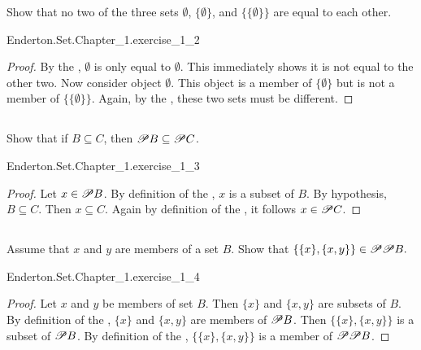 \documentclass{report}
\begin{document}
  Show that no two of the three sets $\emptyset$, $\{\emptyset\}$, and
    $\{\{\emptyset\}\}$ are equal to each other.

    {Enderton.Set.Chapter\_1.exercise\_1\_2}

  \begin{proof}
    By the , $\emptyset$ is only equal to
      $\emptyset$.
    This immediately shows it is not equal to the other two.
    Now consider object $\emptyset$.
    This object is a member of $\{\emptyset\}$ but is not a member of
      $\{\{\emptyset\}\}$.
    Again, by the , these two sets must be
      different.
  \end{proof}

\subsection{}%

  Show that if $B \subseteq C$, then $\mathscr{P}B \subseteq \mathscr{P}C$.

    {Enderton.Set.Chapter\_1.exercise\_1\_3}

  \begin{proof}
    Let $x \in \mathscr{P}B$.
    By definition of the , $x$ is a subset of $B$.
    By hypothesis, $B \subseteq C$.
    Then $x \subseteq C$.
    Again by definition of the , it follows
      $x \in \mathscr{P}C$.
  \end{proof}

\subsection{}%

  Assume that $x$ and $y$ are members of a set $B$.
  Show that $\{\{x\}, \{x, y\}\} \in \mathscr{P}\mathscr{P}B.$

    {Enderton.Set.Chapter\_1.exercise\_1\_4}

  \begin{proof}
    Let $x$ and $y$ be members of set $B$.
    Then $\{x\}$ and $\{x, y\}$ are subsets of $B$.
    By definition of the , $\{x\}$ and $\{x, y\}$ are
      members of $\mathscr{P}B$.
    Then $\{\{x\}, \{x, y\}\}$ is a subset of $\mathscr{P}B$.
    By definition of the , $\{\{x\}, \{x, y\}\}$ is a
      member of $\mathscr{P}\mathscr{P}B$.
  \end{proof}
\end{document}
